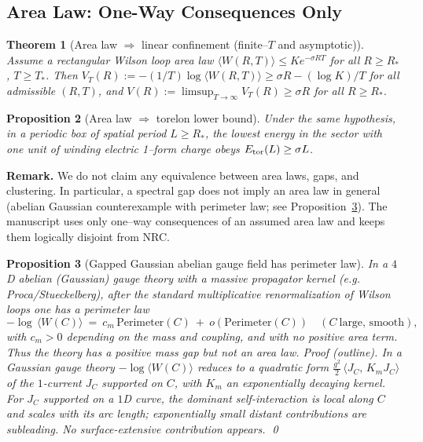 \documentclass[11pt]{amsart}
\theoremstyle{plain}
\newtheorem{theorem}{Theorem}[section]
\newtheorem{proposition}[theorem]{Proposition}
\theoremstyle{definition}
\theoremstyle{remark}
\renewcommand{\tfrac}[2]{\textstyle\frac{#1}{#2}}
\begin{document}

\subsection*{Area Law: One-Way Consequences Only}

\begin{theorem}[Area law $\Rightarrow$ linear confinement (finite--$T$ and asymptotic)]\label{thm:AL-linear}
Assume a rectangular Wilson loop area law $\langle W(R,T)\rangle\le K e^{-\sigma R T}$ for all $R\ge R_\ast$, $T\ge T_\ast$. Then $V_T(R):=-(1/T)\log\langle W(R,T)\rangle\ge \sigma R - (\log K)/T$ for all admissible $(R,T)$, and $V(R):=\limsup_{T\to\infty}V_T(R)\ge \sigma R$ for all $R\ge R_\ast$.
\end{theorem}

\begin{proposition}[Area law $\Rightarrow$ torelon lower bound]\label{prop:AL-torelon}
Under the same hypothesis, in a periodic box of spatial period $L\ge R_\ast$, the lowest energy in the sector with one unit of winding electric 1--form charge obeys $E_{\rm tor}(L)\ge \sigma L$.
\end{proposition}

\begin{mdframed}[linewidth=0.5pt, linecolor=gray!40, backgroundcolor=gray!5, roundcorner=2pt, innertopmargin=8pt, innerbottommargin=8pt, skipabove=10pt, skipbelow=10pt]
\textbf{Remark.} We do not claim any equivalence between area laws, gaps, and clustering. In particular, a spectral gap does not imply an area law in general (abelian Gaussian counterexample with perimeter law; see Proposition~\ref{AL:gaussian-perimeter}). The manuscript uses only one--way consequences of an assumed area law and keeps them logically disjoint from NRC.
\end{mdframed}

\begin{proposition}[Gapped Gaussian abelian gauge field has perimeter law]\label{AL:gaussian-perimeter}
In a $4$D abelian (Gaussian) gauge theory with a massive propagator kernel (e.g. Proca/Stueckelberg), after the standard multiplicative renormalization of Wilson loops one has a \emph{perimeter} law
\[
  -\log\,\langle W(C)\rangle\ =\ c_m\,\mathrm{Perimeter}(C)\ +\ o(\mathrm{Perimeter}(C))\quad(C\ \text{large, smooth}),
\]
with $c_m>0$ depending on the mass and coupling, and with no positive area term. Thus the theory has a positive mass gap but not an area law.
\emph{Proof (outline).} In a Gaussian gauge theory $-\log\langle W(C)\rangle$ reduces to a quadratic form $\tfrac{g^2}{2}\,\langle J_C,\,K_m J_C\rangle$ of the $1$-current $J_C$ supported on $C$, with $K_m$ an exponentially decaying kernel. For $J_C$ supported on a $1$D curve, the dominant self-interaction is local along $C$ and scales with its arc length; exponentially small distant contributions are subleading. No surface-extensive contribution appears. \qed
\end{proposition}
\end{document}

